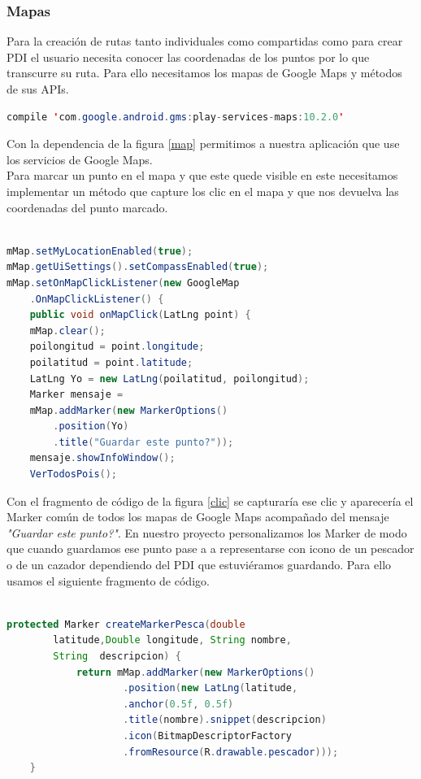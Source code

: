 \subsubsection{Mapas}

 Para la creación de rutas tanto individuales como compartidas como para crear PDI el usuario necesita conocer las coordenadas de los puntos por lo que transcurre su ruta. Para ello necesitamos los mapas de Google Maps y métodos de sus APIs.
 
 
 \begin{lstlisting}[language=java,caption={Dependencia de Google Maps en gradle},label=map]
compile 'com.google.android.gms:play-services-maps:10.2.0'

\end{lstlisting}
 
 Con la dependencia de la figura \ref{map} permitimos a nuestra aplicación que use los servicios de  Google Maps.\\
 	Para marcar un punto en el mapa y que este quede visible en este necesitamos implementar un método que capture los clic en el mapa y que nos devuelva las coordenadas del punto marcado.
 
 
 \begin{lstlisting}[language=java,caption={Captura de clic en la pantalla},label=clic]
    
mMap.setMyLocationEnabled(true);
mMap.getUiSettings().setCompassEnabled(true);
mMap.setOnMapClickListener(new GoogleMap
	.OnMapClickListener() {
	public void onMapClick(LatLng point) {
	mMap.clear();
	poilongitud = point.longitude;
	poilatitud = point.latitude;
	LatLng Yo = new LatLng(poilatitud, poilongitud);
	Marker mensaje = 
	mMap.addMarker(new MarkerOptions()
		.position(Yo)
		.title("Guardar este punto?"));
  	mensaje.showInfoWindow();
	VerTodosPois();

\end{lstlisting} 
 
 
 
 
  Con el fragmento de código de la figura \ref{clic}  se capturaría ese clic y aparecería el Marker común de todos los mapas de Google Maps acompañado del mensaje \textit{"Guardar este punto?"}. En nuestro proyecto personalizamos los Marker de modo que cuando guardamos ese punto pase a a representarse con icono de un pescador o de un cazador dependiendo del PDI que estuviéramos guardando. Para ello usamos el siguiente fragmento de código.

 

\begin{lstlisting}[language=java,caption={Creación de Marker  personalizados},label=DescriptiveLabel]
    
protected Marker createMarkerPesca(double
		latitude,Double longitude, String nombre,
		String	descripcion) {
       		return mMap.addMarker(new MarkerOptions()
                	.position(new LatLng(latitude, 							longitude))
                	.anchor(0.5f, 0.5f)
                	.title(nombre).snippet(descripcion)
	                .icon(BitmapDescriptorFactory
    	       		.fromResource(R.drawable.pescador)));
    }


\end{lstlisting} 
 
